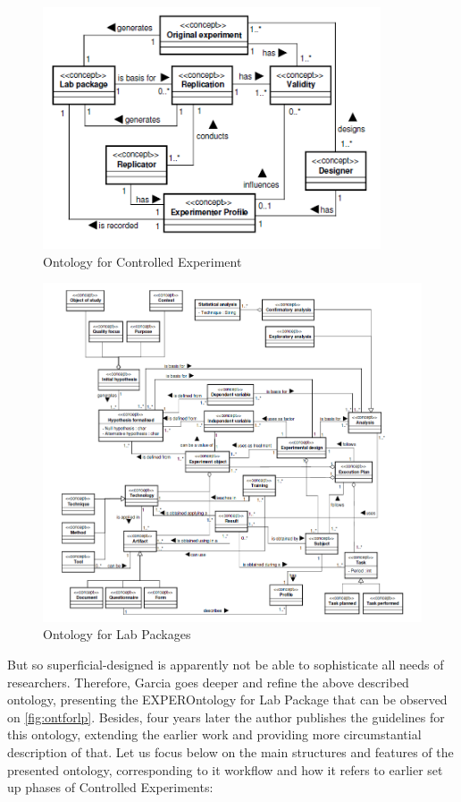 	\begin{figure}
		\centering
		\includegraphics[width=10cm]{images/OntforCE.PNG}
		\caption{Ontology for Controlled Experiment\cite[p. 3]{Gar08}}
		\label{fig:ontforce}
	\end{figure}
	\begin{figure}
		\centering
		\includegraphics[width=15cm]{images/OntforLP.PNG}
		\caption{Ontology for Lab Packages\cite[p. 4]{Gar08}}
		\label{fig:ontforlp}
	\end{figure}
	But so superficial-designed is apparently not be able to sophisticate all needs of researchers. Therefore, Garcia goes deeper and refine the above described ontology,  presenting the EXPEROntology for Lab Package that can be observed on \autoref{fig:ontforlp}. Besides, four years later the author publishes the guidelines for this ontology\cite{Gar11}, extending the earlier work and providing more circumstantial description of that. Let us focus below on the main structures and features of the presented ontology, corresponding to it workflow and how it refers to earlier set up phases of Controlled Experiments:
